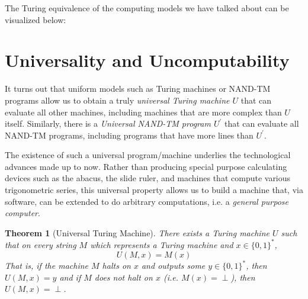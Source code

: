 \documentclass[a4paper, 12pt]{report}
\newtheorem{theorem}{Theorem}[section]
\theoremstyle{remark}
\theoremstyle{definition}
\begin{document}
The Turing equivalence of the computing models we have talked about can be visualized below: 
\begin{center}
\end{center}

\section{Universality and Uncomputability}

It turns out that uniform models such as Turing machines or NAND-TM programs allow us to obtain a truly \textit{universal Turing machine $U$} that can evaluate all other machines, including machines that are more complex than $U$ itself. Similarly, there is a \textit{Universal NAND-TM program $U^\prime$} that can evaluate all NAND-TM programs, including programs that have more lines than $U^\prime$. 

The existence of such a universal program/machine underlies the technological advances made up to now. Rather than producing special purpose calculating devices such as the abacus, the slide ruler, and machines that compute various trigonometric series, this universal property allows us to build a machine that, via software, can be extended to do arbitrary computations, i.e. a \textit{general purpose computer}. 



\begin{theorem}[Universal Turing Machine]
There exists a Turing machine $U$ such that on every string $M$ which represents a Turing machine and $x \in \{0,1\}^*$, 
\[U(M, x) = M(x)\]
That is, if the machine $M$ halts on $x$ and outputs some $y \in \{0,1\}^*$, then $U(M, x) = y$ and if $M$ does not halt on $x$ (i.e. $M(x) = \perp$), then $U(M, x) = \perp$. 
\end{theorem}
\end{document}
